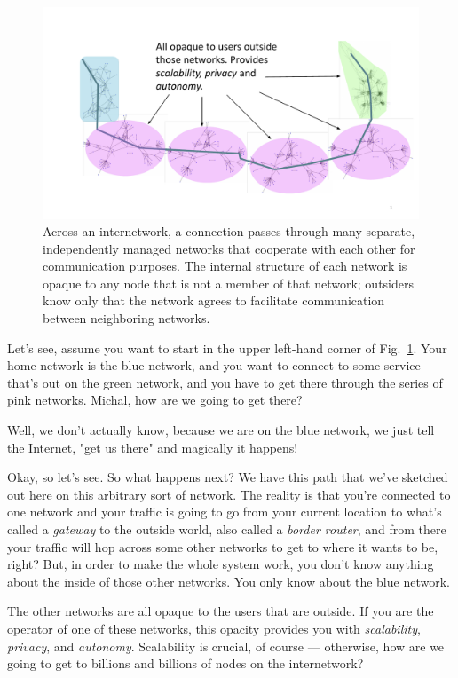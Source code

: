 \begin{figure}[t]
    \centering
    \includegraphics[width=1\textwidth]{lesson15/R2L15fig1.pdf}
    \caption[Network of Networks]{Across an internetwork, a connection passes through many separate, independently managed networks that cooperate with each other for communication purposes.  The internal structure of each network is opaque to any node that is not a member of that network; outsiders know only that the network agrees to facilitate communication between neighboring networks.}
    \label{fig:15-1-NofN}
\end{figure}


Let's see, assume you want to start in the upper left-hand corner of Fig.~\ref{fig:15-1-NofN}. Your home network is the blue network, and you want to connect to some service that's out on the green network, and you have to get there through the series of pink networks. Michal, how are we going to get there?

\mmm Well, we don't actually know, because we are on the blue network, we just tell the Internet, "get us there" and magically it happens!

\rrr Okay, so let's see. So what happens next? We have this path that we've sketched out here on this arbitrary sort of network. The reality is that you're connected to one network and your traffic is going to go from your current location to what's called a \emph{gateway} to the outside world, also called a \emph{border router}, and from there your traffic will hop across some other networks to get to where it wants to be, right? But, in order to make the whole system work, you don't know anything about the inside of those other networks. You only know about the blue network.

The other networks are all opaque to the users that are outside. If you are the operator of one of these networks, this opacity provides you with \emph{scalability}, \emph{privacy}, and \emph{autonomy}. Scalability is crucial, of course --- otherwise, how are we going to get to billions and billions of nodes on the internetwork?

